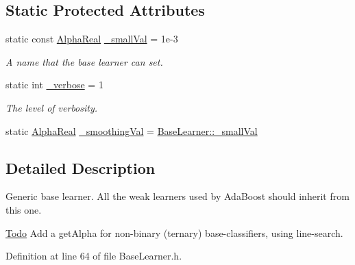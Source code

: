 \subsection*{Static Protected Attributes}
\begin{DoxyCompactItemize}
\item 
static const \hyperlink{Defaults_8h_a80184c4fd10ab70a1a17c5f97dcd1563}{AlphaReal} \hyperlink{classMultiBoost_1_1BaseLearner_ae03efe7fec838d634449716c445c2bfb}{\_\-smallVal} = 1e-\/3
\begin{DoxyCompactList}\small\item\em A name that the base learner can set. \end{DoxyCompactList}\item 
\hypertarget{classMultiBoost_1_1BaseLearner_a481fd8d630a7a62697765341bb2f7d54}{
static int \hyperlink{classMultiBoost_1_1BaseLearner_a481fd8d630a7a62697765341bb2f7d54}{\_\-verbose} = 1}
\label{classMultiBoost_1_1BaseLearner_a481fd8d630a7a62697765341bb2f7d54}

\begin{DoxyCompactList}\small\item\em The level of verbosity. \end{DoxyCompactList}\item 
static \hyperlink{Defaults_8h_a80184c4fd10ab70a1a17c5f97dcd1563}{AlphaReal} \hyperlink{classMultiBoost_1_1BaseLearner_a3b89ad0959563ba3e0fa9d21198aba4d}{\_\-smoothingVal} = \hyperlink{classMultiBoost_1_1BaseLearner_ae03efe7fec838d634449716c445c2bfb}{BaseLearner::\_\-smallVal}
\end{DoxyCompactItemize}


\subsection{Detailed Description}
Generic base learner. All the weak learners used by AdaBoost should inherit from this one. \begin{Desc}
\item[\hyperlink{todo__todo000002}{Todo}]Add a getAlpha for non-\/binary (ternary) base-\/classifiers, using line-\/search. \end{Desc}


Definition at line 64 of file BaseLearner.h.



